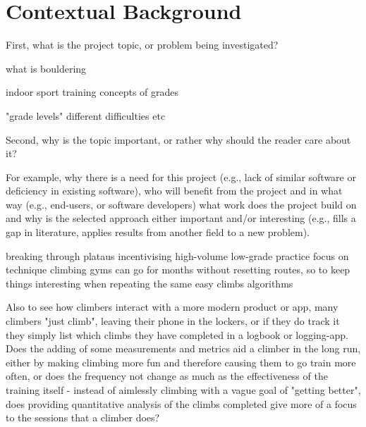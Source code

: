 \chapter{Contextual Background}
\label{chap:context}

%


First, what is the project topic, or problem being investigated?

what is bouldering

indoor sport
training
concepts of grades

"grade levels"
different difficulties etc




Second, why is the topic important, or rather why should the reader care about it?

For example, why there is a need for this project (e.g., lack of similar software or deficiency in existing software), who will benefit from the project and in what way (e.g., end-users, or software developers) what work does the project build on and why is the selected approach either
important and/or interesting (e.g., fills a gap in literature, applies results from another field to a new problem).



breaking through plataus
incentivising high-volume low-grade practice
focus on technique
climbing gyms can go for months without resetting routes, so to keep things interesting when repeating the same easy climbs algorithms

Also to see how climbers interact with a more modern product or app,
many climbers "just climb", leaving their phone in the lockers,
or if they do track it they simply list which climbs they have completed in a logbook or logging-app.
Does the adding of some measurements and metrics aid a climber in the long run,
either by making climbing more fun and therefore causing them to go train more often, or does the frequency not change as much as the effectiveness of the training itself - instead of aimlessly climbing with a vague goal of "getting better", does providing quantitative analysis of the climbs completed give more of a focus to the sessions that a climber does?






